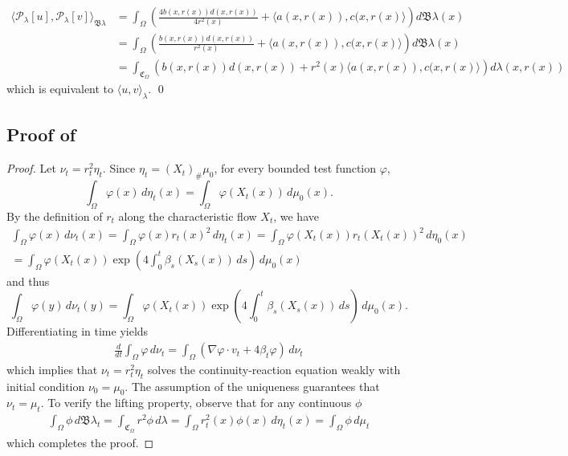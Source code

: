 \documentclass[11pt]{article}
\begin{document}
\begin{align*}
    \langle \mathcal{P}_{\lambda}[u], \mathcal{P}_{\lambda}[v]\rangle_{\mathfrak{B}\lambda} &= \int_{\Omega} \left(\frac{4b(x, r(x))d(x, r(x))}{4r^2(x)} +  \langle a(x, r(x)), c(x,r(x)\rangle\right)d\mathfrak{B\lambda}(x) \\
    &= \int_{\Omega}\left(\frac{b(x, r(x))d(x, r(x))}{r^2(x)} +  \langle a(x, r(x)), c(x,r(x)\rangle\right)d\mathfrak{B\lambda}(x) \\
    &= \int_{\mathfrak{C}_\Omega}\left(b(x, r(x))d(x, r(x)) +  r^2(x)\langle a(x, r(x)), c(x,r(x)\rangle\right)d\lambda(x, r(x))
\end{align*}
which is equivalent to $\langle u, v \rangle_\lambda$. \qed{}

\subsection{Proof of } \label{sec: proof of lifting by characteristics one}

\begin{proof}
    Let $\nu_t = r_t^2 \eta_t$. Since $\eta_t = (X_t)_\# \mu_0$, for every bounded test function $\varphi$,
    \[\int_\Omega \varphi(x) \, d\eta_t(x) = \int_{\Omega} \varphi(X_t(x)) \, d\mu_0(x).\]
    By the definition of $r_t$ along the characteristic flow $X_t$, we have
    \begin{multline*}
    \int_\Omega \varphi(x) \, d\nu_t(x) = \int_\Omega \varphi(x) r_t(x)^2 \, d\eta_t(x) = \int_{\Omega} \varphi(X_t(x)) r_t(X_t(x))^2 \, d\eta_0(x)\\
    = \int_{\Omega} \varphi(X_t(x)) \exp\left(4\int_0^t \beta_s(X_s(x))\, ds\right) \, d\mu_0(x) \end{multline*}
    and thus
    \[\int_\Omega \varphi(y) \, d\nu_t(y) =\int_{\Omega} \varphi(X_t(x)) \exp\left(4\int_0^t \beta_s(X_s(x))\, ds\right) \, d\mu_0(x).\]
    Differentiating in time yields
    \begin{align*}
        \frac{d}{dt}\int_\Omega \varphi \, d\nu_t = \int_\Omega (\nabla \varphi \cdot v_t + 4\beta_t \varphi) \, d\nu_t
    \end{align*}
    which implies that $\nu_t = r_t^2 \eta_t$ solves the continuity-reaction equation weakly with initial condition $\nu_0 = \mu_0$. The assumption of the uniqueness guarantees that $\nu_t = \mu_t$. To verify the lifting property, observe that for any continuous $\phi$
    \begin{align*}
        \int_\Omega \phi \,d\mathfrak{B}\lambda_t = \int_{\mathfrak{C}_\Omega} r^2 \phi \, d\lambda = \int_\Omega r_t^2(x)\phi(x) \, d\eta_t(x) = \int_\Omega \phi \,d\mu_t
    \end{align*}
    which completes the proof.
\end{proof}
\end{document}
